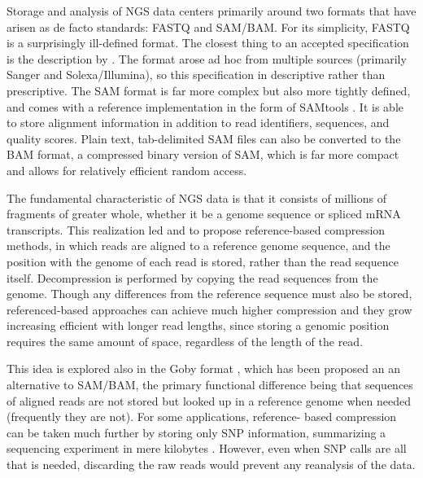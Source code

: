 \documentclass[twocolumn]{article}
\begin{document}
Storage and analysis of NGS data centers primarily around two formats that
have arisen as de facto standards: FASTQ and SAM/BAM. For its simplicity,
FASTQ is a surprisingly ill-defined format. The closest thing to an accepted
specification is the description by \citet{Cock2010}. The format arose ad hoc
from multiple sources (primarily Sanger and Solexa/Illumina), so this
specification in descriptive rather than prescriptive. The SAM format is far
more complex but also more tightly defined, and comes with a reference
implementation in the form of SAMtools \citep{Li2009b}. It is able to store
alignment information in addition to read identifiers, sequences, and quality
scores. Plain text, tab-delimited SAM files can also be converted to the BAM
format, a compressed binary version of SAM, which is far more compact and
allows for relatively efficient random access.




The fundamental characteristic of NGS data is that it consists of millions of
fragments of greater whole, whether it be a genome sequence or spliced mRNA
transcripts. This realization led \citet{Kozanitis2011} and \citet{Hsi-
YangFritz2011} to propose reference-based compression methods, in which reads
are aligned to a reference genome sequence, and the position with the genome
of each read is stored, rather than the read sequence itself. Decompression is
performed by copying the read sequences from the genome. Though any
differences from the reference sequence must also be stored, referenced-based
approaches can achieve much higher compression and they grow increasing
efficient with longer read lengths, since storing a genomic position requires
the same amount of space, regardless of the length of the read.

This idea is explored also in the Goby format \citep{Goby2012}, which has been
proposed an an alternative to SAM/BAM, the primary functional difference being
that sequences of aligned reads are not stored but looked up in a reference
genome when needed (frequently they are not). For some applications, reference-
based compression can be taken much further by storing only SNP information,
summarizing a sequencing experiment in mere kilobytes \citep{Christley2009}.
However, even when SNP calls are all that is needed, discarding the raw reads
would prevent any reanalysis of the data.


\end{document}

